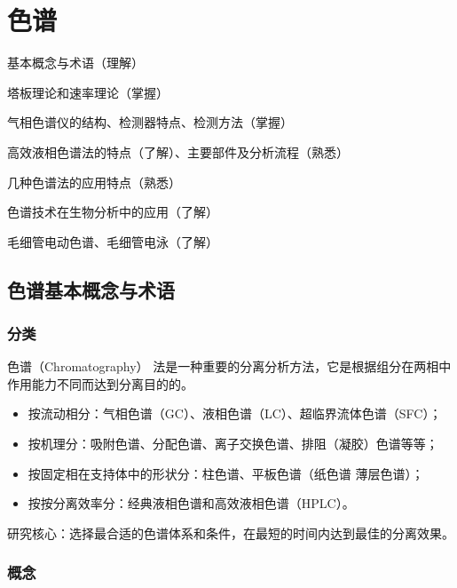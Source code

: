 \chapter{色谱}

\begin{introduction}
	\item 基本概念与术语（理解）
	\item 塔板理论和速率理论（掌握）
	\item 气相色谱仪的结构、检测器特点、检测方法（掌握）
	\item 高效液相色谱法的特点（了解）、主要部件及分析流程（熟悉）
	\item 几种色谱法的应用特点（熟悉）
	\item 色谱技术在生物分析中的应用（了解）
	\item 毛细管电动色谱、毛细管电泳（了解）
\end{introduction}





\section{色谱基本概念与术语}

\subsection{分类}
色谱（Chromatography） 法是一种重要的分离分析方法，它是根据组分在两相中作用能力不同而达到分离目的的。
\begin{itemize}
	\item 按流动相分：气相色谱（GC）、液相色谱（LC）、超临界流体色谱（SFC）；
	\item 按机理分：吸附色谱、分配色谱、离子交换色谱、排阻（凝胶）色谱等等；
	\item 按固定相在支持体中的形状分：柱色谱、平板色谱（纸色谱 薄层色谱）；
	\item 按按分离效率分：经典液相色谱和高效液相色谱（HPLC）。
\end{itemize}

研究核心：选择最合适的色谱体系和条件，在最短的时间内达到最佳的分离效果。

\subsection{概念}

